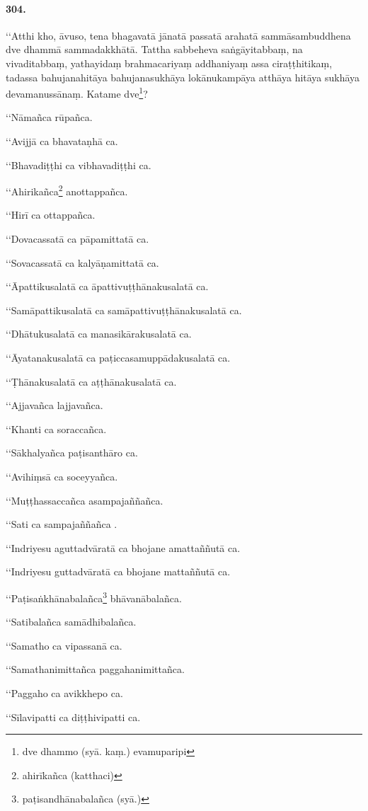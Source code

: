 \paragraph{304.} ‘‘Atthi kho, āvuso, tena bhagavatā jānatā passatā arahatā sammāsambuddhena dve dhammā sammadakkhātā. Tattha sabbeheva saṅgāyitabbaṃ, na vivaditabbaṃ, yathayidaṃ brahmacariyaṃ addhaniyaṃ assa ciraṭṭhitikaṃ, tadassa bahujanahitāya bahujanasukhāya lokānukampāya atthāya hitāya sukhāya devamanussānaṃ. Katame dve\footnote{dve dhammo (syā. kaṃ.) evamuparipi}?

‘‘Nāmañca rūpañca.

‘‘Avijjā ca bhavataṇhā ca.

‘‘Bhavadiṭṭhi ca vibhavadiṭṭhi ca.

‘‘Ahirikañca\footnote{ahirīkañca (katthaci)} anottappañca.

‘‘Hirī ca ottappañca.

‘‘Dovacassatā ca pāpamittatā ca.

‘‘Sovacassatā ca kalyāṇamittatā ca.

‘‘Āpattikusalatā ca āpattivuṭṭhānakusalatā ca.

‘‘Samāpattikusalatā ca samāpattivuṭṭhānakusalatā ca.

‘‘Dhātukusalatā ca manasikārakusalatā ca.

‘‘Āyatanakusalatā ca paṭiccasamuppādakusalatā ca.

‘‘Ṭhānakusalatā ca aṭṭhānakusalatā ca.

‘‘Ajjavañca lajjavañca.

‘‘Khanti ca soraccañca.

‘‘Sākhalyañca paṭisanthāro ca.

‘‘Avihiṃsā ca soceyyañca.

‘‘Muṭṭhassaccañca asampajaññañca.

‘‘Sati ca sampajaññañca .

‘‘Indriyesu aguttadvāratā ca bhojane amattaññutā ca.

‘‘Indriyesu guttadvāratā ca bhojane mattaññutā ca.

‘‘Paṭisaṅkhānabalañca\footnote{paṭisandhānabalañca (syā.)} bhāvanābalañca.

‘‘Satibalañca samādhibalañca.

‘‘Samatho ca vipassanā ca.

‘‘Samathanimittañca paggahanimittañca.

‘‘Paggaho ca avikkhepo ca.

‘‘Sīlavipatti ca diṭṭhivipatti ca.

